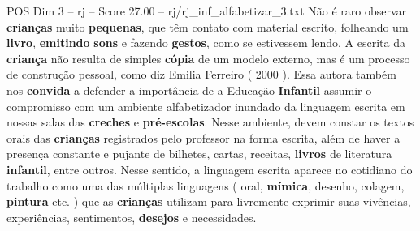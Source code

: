 \begin{textsample}{POS Dim 3 – rj – Score 27.00 – rj/rj\_inf\_alfabetizar\_3.txt}
Não é raro observar \textbf{crianças} muito \textbf{pequenas}, que têm contato com material escrito, folheando um \textbf{livro}, \textbf{emitindo} \textbf{sons} e fazendo \textbf{gestos}, como se estivessem lendo.
A escrita da \textbf{criança} não resulta de simples \textbf{cópia} de um modelo externo, mas é um processo de construção pessoal, como diz Emilia Ferreiro ( 2000 ).
Essa autora também nos \textbf{convida} a defender a importância de a Educação \textbf{Infantil} assumir o compromisso com um ambiente alfabetizador inundado da linguagem escrita em nossas salas das \textbf{creches} e \textbf{pré-escolas}.
Nesse ambiente, devem constar os textos orais das \textbf{crianças} registrados pelo professor na forma escrita, além de haver a presença constante e pujante de bilhetes, cartas, receitas, \textbf{livros} de literatura \textbf{infantil}, entre outros.
Nesse sentido, a linguagem escrita aparece no cotidiano do trabalho como uma das múltiplas linguagens ( oral, \textbf{mímica}, desenho, colagem, \textbf{pintura} etc. ) que as \textbf{crianças} utilizam para livremente exprimir suas vivências, experiências, sentimentos, \textbf{desejos} e necessidades.

\end{textsample}
